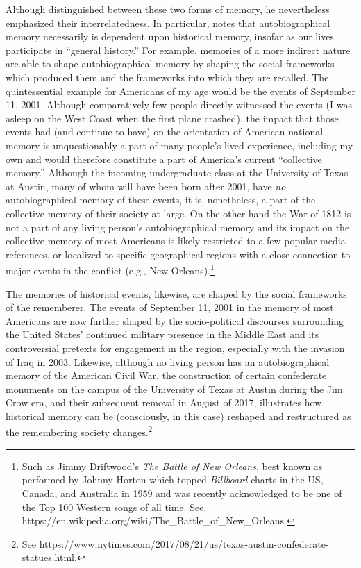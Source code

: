 Although \halbwachs distinguished between these two forms of memory, he nevertheless emphasized their interrelatedness. In particular, \halbwachs notes that autobiographical memory necessarily is dependent upon historical memory, insofar as our lives participate in ``general history.''\autocite[52]{halbwachs1980} For example, memories of a more indirect nature are able to shape autobiographical memory by shaping the social frameworks which produced them and the frameworks into which they are recalled. The quintessential example for Americans of my age would be the events of September 11, 2001. Although comparatively few people directly witnessed the events (I was asleep on the West Coast when the first plane crashed), the impact that those events had (and continue to have) on the orientation of American national memory is unquestionably a part of many people's lived experience, including my own and would therefore constitute a part of America's current ``collective memory.'' Although the incoming undergraduate class at the University of Texas at Austin, many of whom will have been born after 2001, have \emph{no} autobiographical memory of these events, it is, nonetheless, a part of the collective memory of their society at large. On the other hand the War of 1812 is not a part of any living person's autobiographical memory and its impact on the collective memory of most Americans is likely restricted to a few popular media references, or localized to specific geographical regions with a close connection to major events in the conflict (e.g., New Orleans).\footnote{Such as Jimmy Driftwood's \emph{The Battle of New   Orleans}, best known as performed by Johnny Horton which topped   \emph{Billboard} charts in the US, Canada, and Australia in 1959 and   was recently acknowledged to be one of the Top 100 Western songs of   all time. See,   https://en.wikipedia.org/wiki/The\_Battle\_of\_New\_Orleans.}  

The memories of historical events, likewise, are shaped by the social frameworks of the rememberer. The events of September 11, 2001 in the memory of most Americans are now further shaped by the socio-political discourses surrounding the United States' continued military presence in the Middle East and its controversial pretexts for engagement in the region, especially with the invasion of Iraq in 2003. Likewise, although no living person has an autobiographical memory of the American Civil War, the construction of certain confederate monuments on the campus of the University of Texas at Austin during the Jim Crow era, and their subsequent removal in August of 2017, illustrates how historical memory can be (consciously, in this case) reshaped and restructured as the remembering society changes.\footnote{See https://www.nytimes.com/2017/08/21/us/texas-austin-confederate-statues.html.}  


